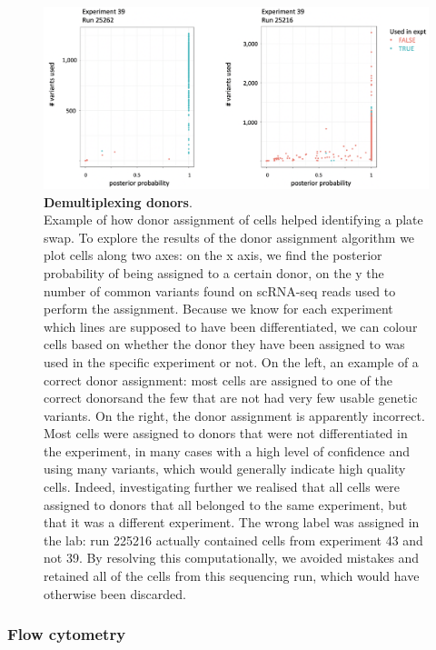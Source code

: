 \begin{figure}[h]
\centering
\includegraphics[width=14cm]{Chapter4/Fig/cardelino_example.png}
\caption[Demultiplexing donors]{\textbf{Demultiplexing donors}.\\
Example of how donor assignment of cells helped identifying a plate swap.
To explore the results of the donor assignment algorithm \cite{mccarthy2020cardelino} we plot cells along two axes: on the x axis, we find the posterior probability of being assigned to a certain donor, on the y the number of common variants found on scRNA-seq reads used to perform the assignment.
Because we know for each experiment which lines are supposed to have been differentiated, we can colour cells based on whether the donor they have been assigned to was used in the specific experiment or not.
On the left, an example of a correct donor assignment: most cells are assigned to one of the correct donors\footnotemark and the few that are not had very few usable genetic variants.
On the right, the donor assignment is apparently incorrect.
Most cells were assigned to donors that were not differentiated in the experiment, in many cases with a high level of confidence and using many variants, which would generally indicate high quality cells.
Indeed, investigating further we realised that all cells were assigned to donors that all belonged to the same experiment, but that it was a different experiment.
The wrong label was assigned in the lab: run 225216 actually contained cells from experiment 43 and not 39.
By resolving this computationally, we avoided mistakes and retained all of the cells from this sequencing run, which would have otherwise been discarded.}
\label{fig:plate_swap}
\end{figure}


\subsubsection{Flow cytometry}

